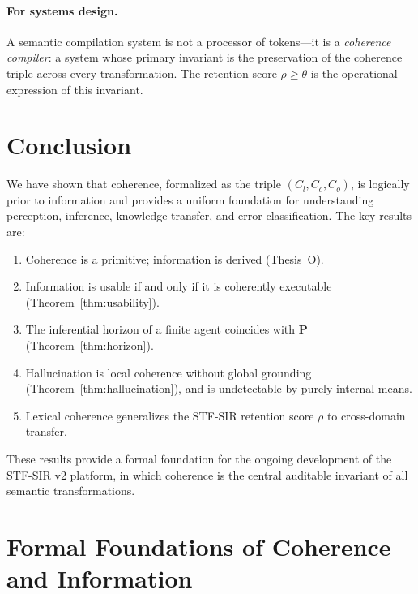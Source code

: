 \documentclass{article}
\newcommand{\STF}{{\normalfont\textsc{STF}}}
\newcommand{\SIR}{{\normalfont\textsc{SIR}}}
\begin{document}
\paragraph{For systems design.}
A semantic compilation system is not a processor of tokens---it is a
\emph{coherence compiler}: a system whose primary invariant is the preservation
of the coherence triple across every transformation.  The retention score
$\rho \geq \theta$ is the operational expression of this invariant.

\section{Conclusion}

We have shown that coherence, formalized as the triple $(C_l, C_c, C_o)$, is
logically prior to information and provides a uniform foundation for
understanding perception, inference, knowledge transfer, and error classification.
The key results are:

\begin{enumerate}
  \item Coherence is a primitive; information is derived (Thesis~O).
  \item Information is usable if and only if it is coherently executable
        (Theorem~\ref{thm:usability}).
  \item The inferential horizon of a finite agent coincides with $\mathbf{P}$
        (Theorem~\ref{thm:horizon}).
  \item Hallucination is local coherence without global grounding
        (Theorem~\ref{thm:hallucination}), and is undetectable by purely internal
        means.
  \item Lexical coherence generalizes the \STF{}-\SIR{} retention score $\rho$
        to cross-domain transfer.
\end{enumerate}

These results provide a formal foundation for the ongoing development of the
\STF{}-\SIR{} v2 platform, in which coherence is the central auditable invariant
of all semantic transformations.

\appendix

\section{Formal Foundations of Coherence and Information}
\label{app:foundations}
\end{document}
